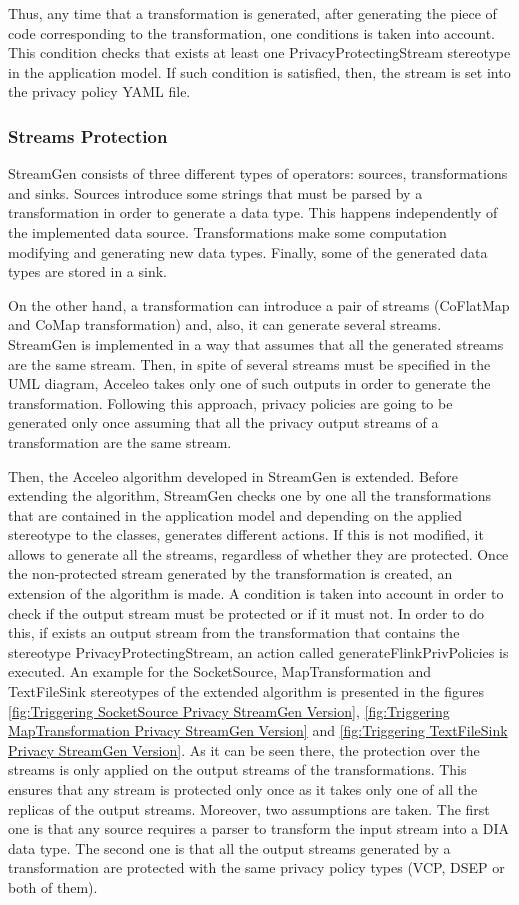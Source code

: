 Thus, any time that a transformation is generated, after generating the piece of code corresponding to the transformation, one conditions is taken into account. This condition checks that exists at least one PrivacyProtectingStream stereotype in the application model. If such condition is satisfied, then, the stream is set into the privacy policy YAML file.

\subsubsection{Streams Protection}

StreamGen consists of three different types of operators: sources, transformations and sinks. Sources introduce some strings that must be parsed by a transformation in order to generate a data type. This happens independently of the implemented data source. Transformations make some computation modifying and generating new data types. Finally, some of the generated data types are stored in a sink.

On the other hand, a transformation can introduce a pair of streams (CoFlatMap and CoMap transformation) and, also, it can generate several streams. StreamGen is implemented in a way that assumes that all the generated streams are the same stream. Then, in spite of several streams must be specified in the UML diagram, Acceleo takes only one of such outputs in order to generate the transformation. Following this approach, privacy policies are going to be generated only once assuming that all the privacy output streams of a transformation are the same stream.

Then, the Acceleo algorithm developed in StreamGen is extended. Before extending the algorithm, StreamGen checks one by one all the transformations that are contained in the application model and depending on the applied stereotype to the classes, generates different actions. If this is not modified, it allows to generate all the streams, regardless of whether they are protected. Once the non-protected stream generated by the transformation is created, an extension of the algorithm is made. A condition is taken into account in order to check if the output stream must be protected or if it must not. In order to do this, if exists an output stream from the transformation that contains the stereotype PrivacyProtectingStream, an action called generateFlinkPrivPolicies is executed. An example for the SocketSource, MapTransformation and TextFileSink stereotypes of the extended algorithm is presented in the figures \ref{fig:Triggering SocketSource Privacy StreamGen Version}, \ref{fig:Triggering MapTransformation Privacy StreamGen Version} and \ref{fig:Triggering TextFileSink Privacy StreamGen Version}. As it can be seen there, the protection over the streams is only applied on the output streams of the transformations. This ensures that any stream is protected only once as it takes only one of all the replicas of the output streams. Moreover, two assumptions are taken. The first one is that any source requires a parser to transform the input stream into a DIA data type. The second one is that all the output streams generated by a transformation are protected with the same privacy policy types (VCP, DSEP or both of them).

